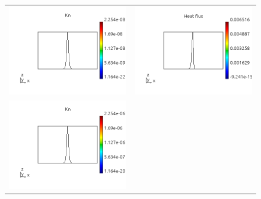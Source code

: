 \documentclass[review]{elsarticle}
\begin{document}
\begin{figure}[tbh]
  \begin{center}
    \begin{tabular}{cc}
      \includegraphics[width=\psize\textwidth]{figs/Kn_p71D1e14.png} &
      \includegraphics[width=\psize\textwidth]{figs/hflux_p71D1e14.png} \\
      \includegraphics[width=\psize\textwidth]{figs/Kn_p71D1e12.png} &

\end{tabular}
\end{center}
\end{figure}
\end{document}
